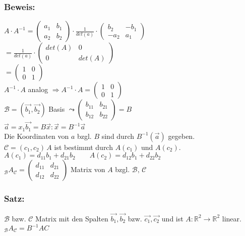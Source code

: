 \subsubsection{Beweis:}
$A\cdot A^{-1} = \begin{pmatrix}a_{1} & b_{1} \\ a_{2} & b_{2} \end{pmatrix} \cdot \frac{1}{det(a)} \cdot \begin{pmatrix} b_{2} & -b_{1} \\ -a_{2} & a_{1} \end{pmatrix}$\\
$ = \frac{1}{det(a)} \cdot \begin{pmatrix} det(A) & 0 \\ 0 & det(A) \end{pmatrix}$\\
$= \begin{pmatrix} 1 & 0 \\ 0 & 1 \end{pmatrix}$\\
$A^{-1}\cdot A$ analog $\Rightarrow A^{-1} \cdot A = \begin{pmatrix} 1 & 0 \\ 0 & 1 \end{pmatrix}$ \\
$\mathcal{B} = (\vec{b_{1}}, \vec{b_{2}})$ Basis $ \leadsto \begin{pmatrix} b_{11} & b_{21} \\ b_{12} & b_{22} \end{pmatrix} = B$\\
$\vec{a} = x_{1}\vec{b_{1}} = B\vec{x} : \vec{x} = B^{-1}\vec{a}$\\
Die Koordinaten von $a$ bzgl. $B$ sind durch $B^{-1}(\vec{a})$ gegeben.\\
$\mathcal{C} = ( c_{1}, c_{2}) \, A$ ist bestimmt durch $A(c_{1})$ und $A(c_{2})$. \\
$A(c_{1}) = d_{11}b_{1}+d_{21}b_{2} \qquad A(c_{2})=d_{12}b_{1}+d_{22}b_{2}$\\
$_{\mathcal{B}}A_{\mathcal{C}} = \begin{pmatrix}d_{11} & d_{21} \\ d_{12} & d_{22} \end{pmatrix}$ Matrix von $A$ bzgl. $\mathcal{B},\, \mathcal{C}$\\
%
%
%
\subsubsection{Satz:}
$\mathcal{B}$ bzw. $\mathcal{C}$ Matrix mit den Spalten $\vec{b_{1}}, \vec{b_{2}}$ bzw. $\vec{c_{1}}, \vec{c_{2}}$ und ist $A: \mathbb{R}^{2} \rightarrow \mathbb{R}^{2}$ linear. \\
$_{\mathcal{B}}A_{\mathcal{C}}=B^{-1}AC$\\
%
%
%
